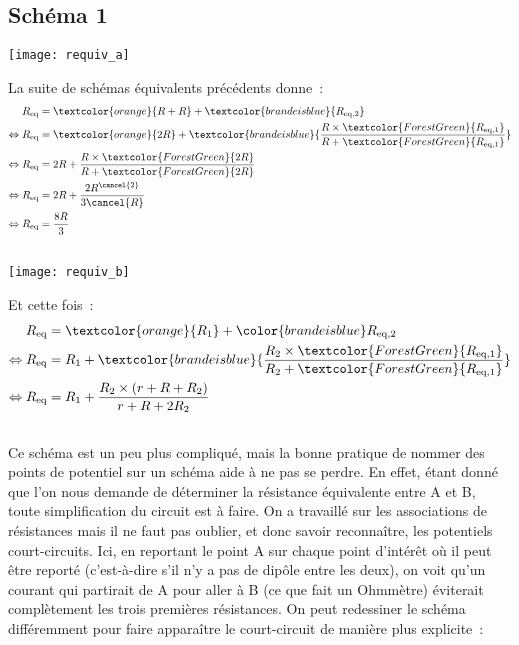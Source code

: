 \documentclass[a4paper, 12pt, final, garamond]{book}
\begin{document}
\subsection{Schéma 1}
\begin{center}
    \texttt{[image: requiv\_a]}
\end{center}
La suite de schémas équivalents précédents donne~:
\begin{align*}
    R_{\rm eq}                 & = \textcolor{orange}{R + R} +
        \textcolor{brandeisblue}{R_{\rm eq,2}} \\
    \Leftrightarrow R_{\rm eq} & = \textcolor{orange}{2R} +
        \textcolor{brandeisblue}{\frac{
                R\times \textcolor{ForestGreen}{R_{\rm eq,1}}
        }{R + \textcolor{ForestGreen}{R_{\rm eq,1}}}}\\
    \Leftrightarrow R_{\rm eq} & = 2R + \frac{
        R\times\textcolor{ForestGreen}{2R}}{
        R+\textcolor{ForestGreen}{2R}} \\
    \Leftrightarrow R_{\rm eq} & = 2R + \frac{2R^{\cancel{2}}}{3\cancel{R}}\\
    \Leftrightarrow R_{\rm eq} & = \frac{8R}{3}
\end{align*}

\subsection{}
\begin{center}
    \texttt{[image: requiv\_b]}
\end{center}
Et cette fois~:
\begin{align*}
    R_{\rm eq}                 & =
    \textcolor{orange}{R_1} + \color{brandeisblue}R_{\rm eq,2} \\
    \Leftrightarrow R_{\rm eq} & =
        R_1 + \textcolor{brandeisblue}{\frac{
        R_2\times \textcolor{ForestGreen}{R_{\rm eq,1}}}{
        R_2 + \textcolor{ForestGreen}{R_{\rm eq,1}}}} \\
    \Leftrightarrow R_{\rm eq} & =
        R_1 + \frac{R_2\times(r+R+R_2)}{r+R+2R_2}\\
\end{align*}

\subsection{}
Ce schéma est un peu plus compliqué, mais la bonne pratique de nommer des points
de potentiel sur un schéma aide à ne pas se perdre. En effet, étant donné que
l'on nous demande de déterminer la résistance équivalente entre A et B, toute
simplification du circuit est à faire. On a travaillé sur les associations de
résistances mais il ne faut pas oublier, et donc savoir reconnaître, les
potentiels court-circuits. Ici, en reportant le point A sur chaque point
d'intérêt où il peut être reporté (c'est-à-dire s'il n'y a pas de dipôle entre
les deux), on voit qu'un courant qui partirait de A pour aller à B (ce que fait
un Ohmmètre) éviterait complètement les trois premières résistances. On peut
redessiner le schéma différemment pour faire apparaître le court-circuit de
manière plus explicite~:
\end{document}
